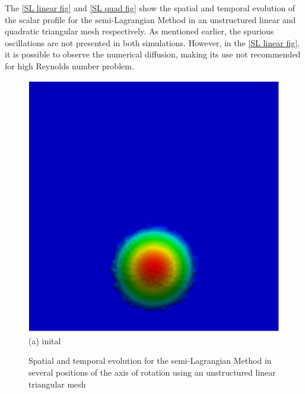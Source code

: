\vspace{-1cm}
The \ref{SL linear fig} and \ref{SL quad fig} 
show the spatial and temporal evolution
of the scalar profile for the semi-Lagrangian Method in an
unstructured linear and quadratic triangular mesh  
respectively. As mentioned earlier, the spurious oscillations 
are not presented in both simulations. 
However, in the \ref{SL linear fig}, it is possible
to observe the numerical diffusion, making its use not
recommended for high Reynolds number problem.

\vspace{0.5cm}
\begin{figure}[H]
     \caption{
Spatial and temporal evolution for the semi-Lagrangian Method in several positions of the axis of rotation using an unstructured linear triangular mesh}	
     \centering
     \begin{minipage}{.5\linewidth}
      \centering
      \includegraphics[scale=0.42]{./02_chaps/cap_validation/figure/figSLlinear0.png}\\
      (a) inital
     \end{minipage}%
     \begin{minipage}{.5\linewidth}
      \centering

\end{minipage}
\end{figure}
